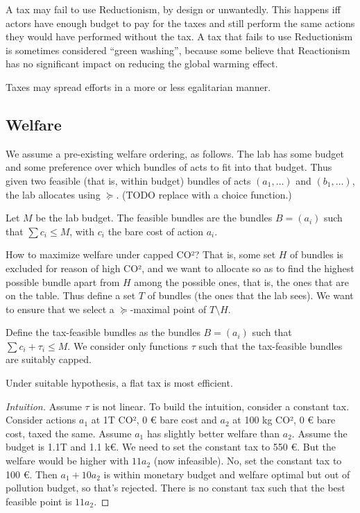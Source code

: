 \documentclass[version=3.21, pagesize, twoside=off, bibliography=totoc, DIV=calc, fontsize=12pt, a4paper, french, english]{scrartcl}
\begin{document}
A tax may fail to use Reductionism, by design or unwantedly. This happens iff actors have enough budget to pay for the taxes and still perform the same actions they would have performed without the tax. A tax that fails to use Reductionism is sometimes considered “green washing”, because some believe that Reactionism has no significant impact on reducing the global warming effect.

Taxes may spread efforts in a more or less egalitarian manner.

\subsection{Welfare}
We assume a pre-existing welfare ordering, as follows. The lab has some budget and some preference over which bundles of acts to fit into that budget. Thus given two feasible (that is, within budget) bundles of acts $(a_1, …)$ and $(b_1, …)$, the lab allocates using $\succeq$. (TODO replace with a choice function.)

Let $M$ be the lab budget. The feasible bundles are the bundles $B = (a_i)$ such that $\sum c_i ≤ M$, with $c_i$ the bare cost of action $a_i$.

How to maximize welfare under capped CO²? That is, some set $H$ of bundles is excluded for reason of high CO², and we want to allocate so as to find the highest possible bundle apart from $H$ among the possible ones, that is, the ones that are on the table. Thus define a set $T$ of bundles (the ones that the lab sees). We want to ensure that we select a $\succeq$-maximal point of $T \setminus H$.

Define the tax-feasible bundles as the bundles $B = (a_i)$ such that $\sum c_i + \tau_i ≤ M$.
We consider only functions $\tau$ such that the tax-feasible bundles are suitably capped.

\begin{theorem}
	Under suitable hypothesis, a flat tax is most efficient.
\end{theorem}
\begin{proof}[Intuition]
	Assume $\tau$ is not linear. To build the intuition, consider a constant tax. Consider actions $a_1$ at 1T CO², 0 € bare cost and $a_2$ at 100 kg CO², 0 € bare cost, taxed the same. Assume $a_1$ has slightly better welfare than $a_2$.
	Assume the budget is 1.1T and 1.1 k€. We need to set the constant tax to 550 €. But the welfare would be higher with $11 a_2$ (now infeasible). No, set the constant tax to 100 €. Then $a_1 + 10 a_2$ is within monetary budget and welfare optimal but out of pollution budget, so that’s rejected. There is no constant tax such that the best feasible point is $11 a_2$.
\end{proof}
		
\end{document}
